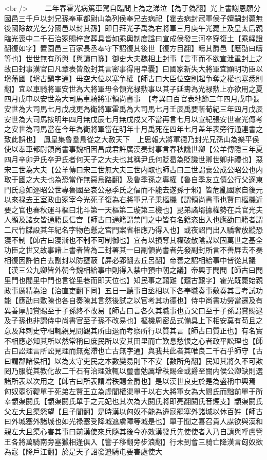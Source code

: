 <br />
　　二年春霍光病篤車駕自臨問上為之涕泣【為于偽翻】光上書謝恩願分國邑三千戶以封兄孫奉車都尉山為列侯奉兄去病祀【霍去病封冠軍侯子嬗嗣封薨無後國除故光乞分國邑以封其孫】即日拜光子禹為右將軍三月庚午光薨上及皇太后親臨光喪中二千石治冢賜梓宫葬具皆如乘輿制度諡曰宣成侯發三河卒穿復土【乘䋲證翻復如字】置園邑三百家長丞奉守下詔復其後世【復方目翻】疇其爵邑【應劭曰疇等也】世世無有所與【與讀曰豫】御史大夫魏相上封事【言事而不欲宣泄重封上之故曰封事漢官曰凡章表皆啟封其言密事得用皁囊】曰國家新失大將軍宜顯明功臣以塡藩國【塡古鎭字通】毋空大位以塞争權【師古曰大臣位空則起争奪之權也塞悉則翻】宜以車騎將軍安世為大將軍毋令領光禄勲事以其子延夀為光禄勲上亦欲用之夏四月戊申以安世為大司馬車騎將軍領尚書事　【考異曰百官表地節三年四月戊申張安世為大司馬七月戊戌更為衛將軍霍禹為大司馬七月壬辰禹要斬荀紀三年四月戊辰安世為大司馬按明年四月無戊辰七月無戊戍又不當再言七月以宣紀張安世霍光傳考之安世為司馬當在今年為衛將軍當在明年十月禹死在四年七月盖年表旁行通連書之致此誤也】　鳳皇集魯羣鳥從之大赦天下　上思報大將軍德乃封光兄孫山為樂平侯使以奉車都尉領尚書事魏相因昌成君許廣漢奏封事言春秋譏世卿【公羊傳隱三年夏四月辛卯尹氏卒尹氏者何天子之大夫也其稱尹氏何貶曷為貶譏世卿世卿非禮也】惡宋三世為大夫【公羊傳曰宋三世無大夫三世内取也師古曰三世謂襄公成公昭公也内取于國之大夫也為恐當作無惡烏路翻】及魯季孫之專權【魯自季友立僖公行父逐東門氏意如逐昭公世專魯國至哀公惡季氏之偪而不能去遂孫于邾】皆危亂國家自後元以來禄去王室政由冢宰今光死子復為右將軍兄子秉樞機【謂領尚書事也賢曰樞機近要之官也春秋運斗樞曰北斗第一天樞第二璇第三機也】昆弟諸壻據權勢在兵官光夫人顯及諸女皆通籍長信宫【師古曰通籍謂禁門之中皆有名籍恣出入也應劭曰籍者謂二尺竹牒設其年紀名字物色懸之宫門案省相應乃得入也】或夜詔門出入驕奢放縱恐寖不制【師古曰寖漸也不制不可制御也】宜有以損奪其權破散隂謀以固萬世之基全功臣之世又故事諸上書者皆為二封署其一曰副領尚書者先發副封所言不善屛去不奏相復因許伯白去副封以防壅蔽【屏必郢翻去丘呂翻】帝善之詔相給事中皆從其議【漢三公九卿皆外朝今魏相給事中則得入禁中預中朝之議】帝興于閭閻【師古曰閭里門也閻里中門也言從里巷而即天位也】知民事之囏難【囏古艱字】霍光既薨始親政事厲精為治【治直吏翻下同】五日一聽事自丞相以下各奉職奏事敷奏其言考試功能【應劭曰敷陳也各自奏陳其言然後試之以官考其功德也】侍中尚書功勞當遷及有異善厚加賞賜至于子孫終不改易【師古曰言各久其職事也貢父曰至于子孫謂賞賜逮及子孫也非謂侍中尚書官至子孫不改易也】樞機周密品式備具上下相安莫有苟且之意及拜刺史守相輒親見問觀其所由退而考察所行以質其言【師古曰質正也】有名實不相應必知其所以然常稱曰庶民所以安其田里而亡歎息愁恨之心者政平訟理也【師古曰訟理言所訟見理而無寃滯也亡古無字通】與我共此者其唯良二千石乎師守【古曰謂郡諸侯相】以為太守吏民之本數變易則下不安【數所角翻】民知其將久不可欺罔乃服從其教化故二千石有治理效輒以璽書勉厲增秩賜金或爵至關内侯公卿缺則選諸所表以次用之【師古曰所表謂增秩賜金爵也】是以漢世良吏於是為盛稱中興焉　匈奴壺衍鞮單于死弟左賢王立為虚閭權渠單于以右大將軍女為大閼氏而黜前單于所幸顓渠閼氏【顓渠閼氏單于之元妃也其次為大閼氏將即亮翻閼氏音煙支】顓渠閼氏父左大且渠怨望【且子閭翻】是時漢以匈奴不能為邉寇罷塞外諸城以休百姓【師古曰外城塞外諸城也如光禄塞受降城遮虜障等城是也】單于聞之喜召貴人謀欲與漢和親左大且渠心害其事曰前漢使來兵隨其後今亦效漢發兵先使使者入乃自請與呼盧訾王各將萬騎南旁塞獵相逢俱入【訾子移翻旁步浪翻】行未到會三騎亡降漢言匈奴欲為寇【降戶江翻】於是天子詔發邉騎屯要害處使大
